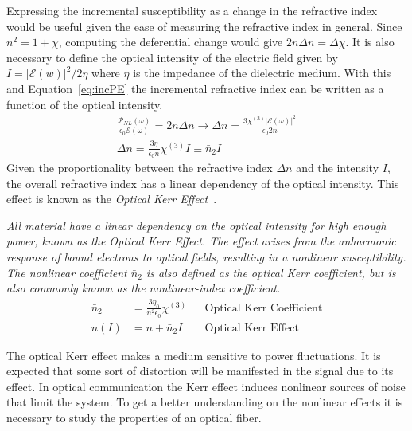 Expressing the incremental susceptibility as a change in the refractive index would be useful given the ease of measuring the refractive index in general. Since $n^2=1+\chi$, computing the deferential change would give $2n\Delta n = \Delta\chi$. It is also necessary to define the optical intensity of the electric field  given by $I=|\mathcal{E}(w)|^2/2\eta$ where $\eta$ is the impedance of the dielectric medium. With this and Equation~\ref{eq:incPE} the incremental refractive index can be written as a function of the optical intensity.
\begin{subequations}
\begin{gather}
\frac{\mathcal{P}_{NL}(\omega)}{\epsilon_0\mathcal{E}(\omega)}=2n\Delta n \rightarrow \Delta n= \frac{3\chi^{(3)}|\mathcal{E}(\omega)|^2}{\epsilon_0 2n}\\
\Delta n =\frac{3\eta}{\epsilon_0 n }\chi^{(3)}I\equiv \bar{n}_2 I
\end{gather}
\label{eq:Deltan}
\end{subequations}
\noindent Given the proportionality between the refractive index $\Delta n $ and the intensity $I$, the overall refractive index has a linear dependency of the optical intensity. This effect is known as the \emph{Optical Kerr Effect}~\cite{stolen1973optical}. 



\begin{tcolorbox}[title=Optical Kerr Effect]
\emph{ All material have a linear dependency on the optical intensity for high enough power, known as the Optical Kerr Effect. The effect arises from the anharmonic response of bound electrons to optical fields, resulting in a nonlinear susceptibility. The nonlinear coefficient $\bar{n}_2$ is also defined as the optical Kerr coefficient, but is also commonly known as the nonlinear-index coefficient.~\cite{FiberAgrawal,boyd2003nonlinear}  }
\begin{subequations}
\begin{align}
\bar{n}_2&=\frac{3\eta_0}{n^2\epsilon_0}\chi^{(3)} &  &\text{Optical Kerr Coefficient}\\
n(I)&=n+\bar{	n}_2I  &  &\text{Optical Kerr Effect}
\end{align}
\end{subequations}
\end{tcolorbox}

The optical Kerr effect makes a medium sensitive to power fluctuations. It is expected that some sort of distortion will be manifested in the signal due to its effect. In optical communication the Kerr effect induces nonlinear sources of noise that limit the system. To get a better understanding on the nonlinear effects it is necessary to study the properties of an optical fiber.




